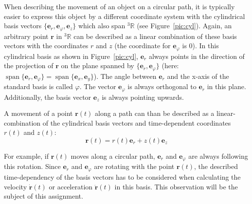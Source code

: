 \documentclass[10pt]{article}
\begin{document}
When describing the movement of an object on a circular path, it is typically easier to express this
object by a different coordinate system with the cylindrical basis vectors
$\{\mathbf{e}_r, \mathbf{e}_\varphi, \mathbf{e}_z\}$ which also span ${}^3\mathbb{R}$ (see
Figure~\ref{pic:cyl}). Again, an arbitrary point $\mathbf{r}$ in ${}^3\mathbb{R}$ can be described
as a linear combination of these basis vectors with the coordinates $r$ and $z$ (the coordinate for
$\mathbf{e}_\varphi$ is 0).  In this cylindrical basis as shown in Figure~\ref{pic:cyl},
$\mathbf{e}_r$ always points in the direction of the projection of $\mathbf{r}$ on the plane spanned
by $\{\mathbf{e}_r, \mathbf{e}_\varphi\}$ (here:
$\operatorname{span} \{\mathbf{e}_r, \mathbf{e}_\varphi\} = \operatorname{span}\{\mathbf{e}_x,
\mathbf{e}_y\}$). The angle between $\mathbf{e}_r$ and the x-axis of the standard basis is called
$\varphi$. The vector $\mathbf{e}_\varphi$ is always orthogonal to $\mathbf{e}_r$ in this
plane. Additionally, the basis vector $\mathbf{e}_z$ is always pointing upwards.

A movement of a point $\mathbf{r}(t)$ along a path can than be described as a linear-combination of
the cylindrical basis vectors and time-dependent coordinates $r(t)$ and $z(t)$:
\begin{equation*}
  \mathbf{r}(t) = r(t) \mathbf{e}_r + z(t) \mathbf{e}_z
\end{equation*}

For example, if $\mathbf{r}(t)$ moves along a circular path, $\mathbf{e}_r$ and $\mathbf{e}_\varphi$
are always following this rotation. Since $\mathbf{e}_r$ and $\mathbf{e}_\varphi$ are rotating with
the point $\mathbf{r}(t)$, the described time-dependency of the basis vectors has to be considered
when calculating the velocity $\mathbf{\dot r}(t)$ or acceleration $\mathbf{\ddot r}(t)$ in this
basis. This observation will be the subject of this
assignment.\\
\end{document}

